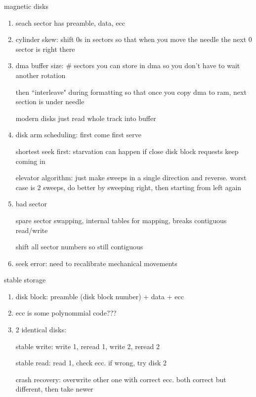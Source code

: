 \documentclass[11pt]{article}
\begin{document}
magnetic disks
\begin{enumerate}
    \item seach sector has preamble, data, ecc
    \item cylinder skew: shift 0s in sectors so that when you move the needle the next 0 sector is right there
    \item dma buffer size: \# sectors you can store in dma so you don't have to wait another rotation

        then ``interleave" during formatting so that once you copy dma to ram, next section is under needle

        modern disks just read whole track into buffer

    \item disk arm scheduling: first come first serve

        shortest seek first: starvation can happen if close disk block requests keep coming in

        elevator algorithm: just make sweeps in a single direction and reverse. worst case is 2 sweeps,
        do better by sweeping right, then starting from left again

    \item bad sector

        spare sector swapping, internal tables for mapping, breaks contiguous read/write

        shift all sector numbers so still contiguous

    \item seek error: need to recalibrate mechanical movements
\end{enumerate}

stable storage
\begin{enumerate}
    \item disk block: preamble (disk block number) + data + ecc
    \item ecc is some polynommial code???

    \item 2 identical disks:

        stable write: write 1, reread 1, write 2, reread 2

        stable read: read 1, check ecc. if wrong, try disk 2

        crash recovery: overwrite other one with correct ecc. both correct but different, then take newer
\end{enumerate}
\end{document}
